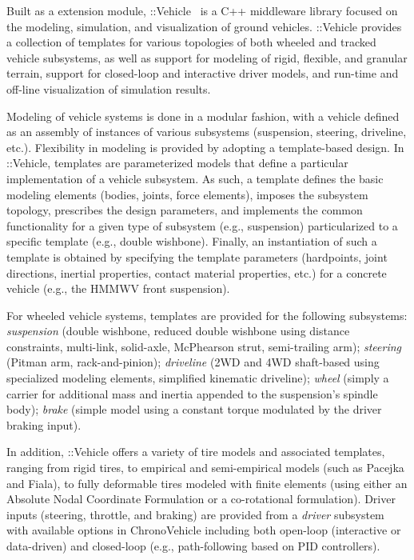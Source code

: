 \documentclass[12pt,twocolumn]{article}
\newcommand{\CHRONO}{{\sffamily{{Chrono}}}}
\newcommand{\ChronoVehicle}{{\sffamily{Chrono}}::Vehicle}
\begin{document}
Built as a {\CHRONO} extension module, {\ChronoVehicle}~\cite{ChronoVehicle_paper} is a C++ middleware library focused on the modeling, simulation, and visualization of ground vehicles.
%
{\ChronoVehicle} provides a collection of templates for various topologies of both wheeled and tracked vehicle subsystems, as well as support for modeling of rigid, flexible, and granular terrain, support for closed-loop and interactive driver models, and run-time and off-line visualization of simulation results.

Modeling of vehicle systems is done in a modular fashion, with a vehicle defined as an assembly of instances of various subsystems (suspension, steering, driveline, etc.).  Flexibility in modeling is provided by adopting a template-based design. In {\ChronoVehicle}, templates are parameterized models that define a particular implementation of a vehicle subsystem. As such, a template defines the basic modeling elements (bodies, joints, force elements), imposes the subsystem topology, prescribes the design parameters, and implements the common functionality for a given type of subsystem (e.g., suspension) particularized to a specific template (e.g., double wishbone). Finally, an instantiation of such a template is obtained by specifying the template parameters (hardpoints, joint directions, inertial properties, contact material properties, etc.) for a concrete vehicle (e.g., the HMMWV front suspension).

For wheeled vehicle systems, templates are provided for the following subsystems:
{\em suspension} (double wishbone, reduced double wishbone using distance constraints, multi-link, solid-axle, McPhearson strut, semi-trailing arm);
{\em steering} (Pitman arm, rack-and-pinion);
{\em driveline} (2WD and 4WD shaft-based using specialized {\CHRONO} modeling elements, simplified kinematic driveline);
{\em wheel} (simply a carrier for additional mass and inertia appended to the suspension's spindle body);
{\em brake} (simple model using a constant torque modulated by the driver braking input).

In addition, {\ChronoVehicle} offers a variety of tire models and associated templates, ranging from rigid tires, to empirical and semi-empirical models (such as Pacejka and Fiala), to fully deformable tires modeled with finite elements (using either an Absolute Nodal Coordinate Formulation or a co-rotational formulation).  Driver inputs (steering, throttle, and braking) are provided from a {\em driver} subsystem with available options in {ChronoVehicle} including both open-loop (interactive or data-driven) and closed-loop (e.g., path-following based on PID controllers).
\end{document}
